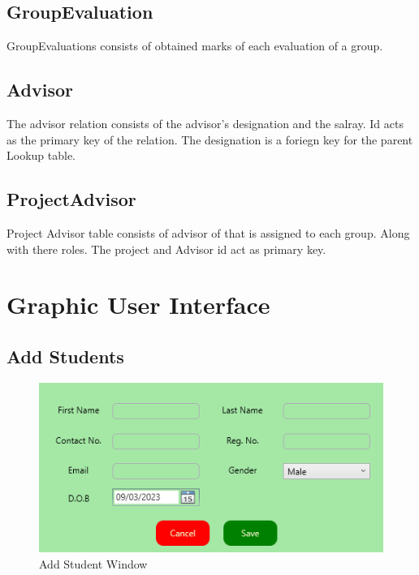 \documentclass[a4paper, 12pt, oneside]{uet_thesis}
\begin{document}
\section{GroupEvaluation}
GroupEvaluations consists of obtained marks of each evaluation of a group.

\section{Advisor}
The advisor relation consists of the advisor's designation and the salray. Id acts as the primary key of the relation. The designation is a foriegn key for the parent Lookup table.

\section{ProjectAdvisor}
Project Advisor table consists of advisor of that is assigned to each group. Along with there roles. The project and Advisor id act as primary key.

\clearpage


\chapter{Graphic User Interface}

\section{Add Students}
\begin{figure}[h]
    \centering
    \includegraphics[width=1\textwidth]{Figures/AddStudent.png}
    \caption{Add Student Window}
    \label{fig:my_label}
\end{figure}
\end{document}
